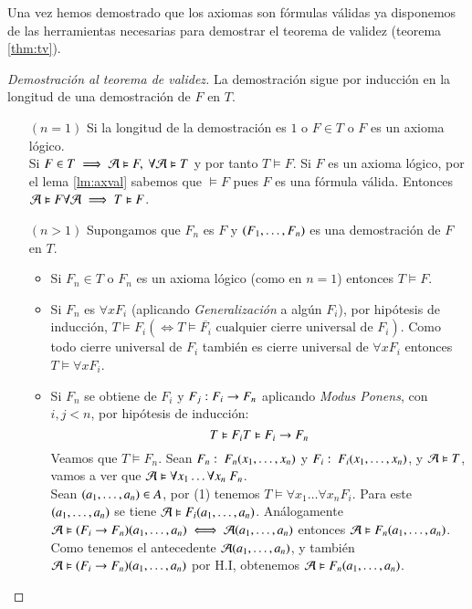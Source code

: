 Una vez hemos demostrado que los axiomas son fórmulas válidas ya disponemos de las herramientas necesarias para demostrar el teorema de validez (teorema \ref{thm:tv}).

\begin{proof}[Demostración al teorema de validez]\label{proof:tv}
    La demostración sigue por inducción en la longitud de una demostración de $F$ en $T$.
    \begin{itemize}
        \item[$(n=1)$] Si la longitud de la demostración es $1$ o $F \in T$ o $F$ es un axioma lógico.\\
        Si $F \in T \implies \mathcal{A} \vDash F,\ \forall \mathcal{A} \vDash T$ y por tanto $T \vDash F$.
        Si $F$ es un axioma lógico, por el lema \ref{lm:axval} sabemos que $ \vDash F$ pues $F$ es una fórmula válida. Entonces $\mathcal{A} \vDash F \forall \mathcal{A} \implies T \vDash F$.

        \item[$(n>1)$]
        Supongamos que $F_n$ es $F$ y $({F}_{1}, \ldots, {F}_{n})$ es una demostración de $F$ en $T$.
        \begin{itemize}
            \item Si $F_n \in T$ o $F_n$ es un axioma lógico (como en $n=1$) entonces $T \vDash F$.
            \item Si $F_n$ es $\forall x F_i$ (aplicando \textit{Generalización} a algún $F_i$), por hipótesis de inducción, $T \vDash F_i (\iff T \vDash \overline{F_i} \text{ cualquier cierre universal de }F_i)$. Como todo cierre universal de $F_i$ también es cierre universal de $\forall x F_i$ entonces $T \vDash \forall x F_i$.
            \item Si $F_n$ se obtiene de $F_i$ y $F_j: F_i \rightarrow F_n$ aplicando \textit{Modus Ponens}, con $i, j < n$, por hipótesis de inducción:
            \begin{equation}
                T \vDash F_i\\
                T \vDash F_i \rightarrow F_n
            \end{equation}
            Veamos que $T \vDash F_n$. Sean $F_n:\ F_n({x}_{1}, \ldots, {x}_{n})$ y $F_i:\ F_i({x}_{1}, \ldots, {x}_{n})$, y $\mathcal{A} \vDash T$, vamos a ver que $\mtc A \vDash \forall x_1 \ldots \forall x_n\ F_n$.\\
            Sean $({a}_{1}, \ldots, {a}_{n})\in A$, por (1) tenemos $T \vDash \forall x_1 \ldots \forall x_n F_i$. Para este $({a}_{1}, \ldots, {a}_{n})$ se tiene $\mathcal{A} \vDash F_i({a}_{1}, \ldots, {a}_{n})$.
            Análogamente $\mathcal{A} \vDash (F_i \rightarrow F_n)({a}_{1}, \ldots, {a}_{n}) \iff \mathcal{A} ({a}_{1}, \ldots, {a}_{n})$ entonces $\mathcal{A} \vDash F_n({a}_{1}, \ldots, {a}_{n})$.\\
            Como tenemos el antecedente $\mathcal{A} ({a}_{1}, \ldots, {a}_{n})$, y también $\mathcal{A} \vDash (F_i \rightarrow F_n)({a}_{1}, \ldots, {a}_{n})$ por H.I, obtenemos $\mathcal{A} \vDash F_n({a}_{1}, \ldots, {a}_{n})$.
        \end{itemize}
    \end{itemize}
\end{proof}

